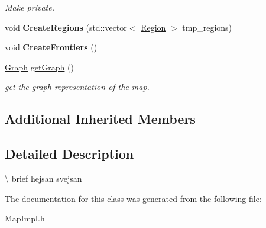 \begin{DoxyCompactItemize}
\begin{DoxyCompactList}\small\item\em Make private. \end{DoxyCompactList}\item 
void {\bfseries Create\+Regions} (std\+::vector$<$ \hyperlink{classOverseer_1_1Region}{Region} $>$ tmp\+\_\+regions)\hypertarget{classOverseer_1_1MapImpl_a869ff3f368caf2d4974bcec7f106421e}{}\label{classOverseer_1_1MapImpl_a869ff3f368caf2d4974bcec7f106421e}

\item 
void {\bfseries Create\+Frontiers} ()\hypertarget{classOverseer_1_1MapImpl_acb13a06511f15774550bdf399d3fdd47}{}\label{classOverseer_1_1MapImpl_acb13a06511f15774550bdf399d3fdd47}

\item 
\hyperlink{classOverseer_1_1Graph}{Graph} \hyperlink{classOverseer_1_1MapImpl_abedbb01faa88ff9bd3f8cd2dbec0dead}{get\+Graph} ()\hypertarget{classOverseer_1_1MapImpl_abedbb01faa88ff9bd3f8cd2dbec0dead}{}\label{classOverseer_1_1MapImpl_abedbb01faa88ff9bd3f8cd2dbec0dead}

\begin{DoxyCompactList}\small\item\em get the graph representation of the map. \end{DoxyCompactList}\end{DoxyCompactItemize}
\subsection*{Additional Inherited Members}


\subsection{Detailed Description}
\textbackslash{} brief hejsan svejsan 

The documentation for this class was generated from the following file\+:\begin{DoxyCompactItemize}
\item 
Map\+Impl.\+h\end{DoxyCompactItemize}

